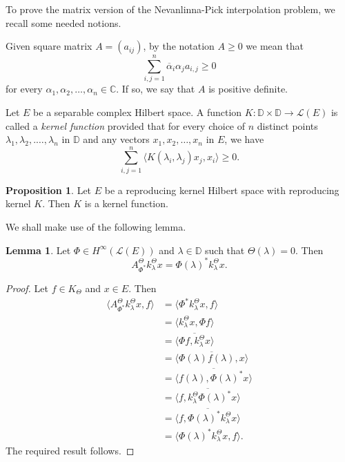\documentclass{amsart}
\theoremstyle{definition}
\newtheorem{prop}[thm]{Proposition}
\newtheorem{lem}[thm]{Lemma}
\newcommand{\oL }{\mathcal{L}(E) }
\begin{document}
To prove the matrix version of the Nevanlinna-Pick interpolation problem, we recall some needed notions.

Given square matrix $A=(a_{ij})$, by the notation $A\geq 0$ we mean that
$$\sum_{i,j=1}^{n}\overline{\alpha}_i\alpha_j a_{i,j}\geq 0$$
 for every $\alpha_1, \alpha_2,\dots,\alpha_n \in \mathbb{C}$. 
 If so, we say that $A$ is positive definite. 

Let $E$ be a separable complex Hilbert space. A function $K: \mathbb{D} \times \mathbb{D}\to \oL$ is called a \emph{kernel function} provided that for every choice of $n$ distinct points $\lambda_1, \lambda_2,.\dots,\lambda_n$ in $\mathbb{D}$ and any vectors $x_1,x_2,\dots,x_n$ in $E$, we have
$$\sum_{i,j=1}^n\big\langle K(\lambda_i, \lambda_j)x_j, x_i\big\rangle\geq 0.$$

\begin{prop}\cite[Proposition 2.13]{VP}\label{VP}
     Let $E$ be a reproducing kernel Hilbert space with reproducing kernel $K$. Then $K$ is a kernel function.
\end{prop}

 We shall make use of the following lemma.

\begin{lem}
    Let $\Phi\in H^\infty(\oL)$ and $\lambda\in \mathbb{D}$ such that $\Theta(\lambda)=0$. Then 
    $$A_{\Phi^*}^{\Theta}k_{\lambda}^{\Theta}x=\Phi(\lambda)^*k^{\Theta}_{\lambda}x.$$
\end{lem}

\begin{proof}
Let $f\in K_{\Theta}$ and $x\in E$. Then
\begin{align*}
    \langle A_{\Phi^*}^{\Theta}k_{\lambda}^{\Theta}x, f\rangle
   & =\langle \Phi^* k_{\lambda}^{\Theta}x, f\rangle\\
    &=\langle  k_{\lambda}^{\Theta}x, \Phi f\rangle\\
      &=\overline{\langle  \Phi f, k_{\lambda}^{\Theta}x\rangle}\\
      &=\overline{\langle  \Phi(\lambda) f(\lambda), x\rangle}\\
      &=\overline{\langle   f(\lambda), \Phi(\lambda)^* x\rangle}\\
&=\overline{\langle   f, k_{\lambda}^{\Theta}\Phi(\lambda)^* x\rangle}\\
&=\overline{\langle   f,\Phi(\lambda)^* k_{\lambda}^{\Theta} x\rangle}\\
&=\langle \Phi(\lambda)^* k_{\lambda}^{\Theta} x,  f\rangle.
\end{align*}
The required result follows.
\end{proof}
\end{document}
